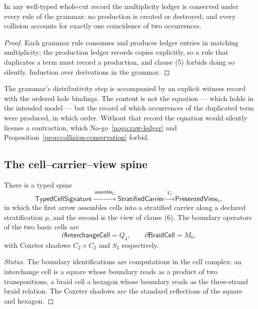 \begin{proposition}\label{prop:collision-conservation}
In any well-typed whole-cut record the multiplicity ledger is conserved under every rule of
the grammar: no production is created or destroyed, and every collision accounts for
exactly one coincidence of two occurrences.
\end{proposition}

\begin{proof}
Each grammar rule consumes and produces ledger entries in matching multiplicity; the
production ledger records copies explicitly, so a rule that duplicates a term must record a
production, and clause (5) forbids doing so silently.  Induction over derivations in the
grammar.
\end{proof}

\begin{remark}
The grammar's distributivity step is accompanied by an explicit witness record with the
ordered hole bindings.  The content is not the equation --- which holds in the intended
model --- but the record of which occurrences of the duplicated term were produced, in
which order.  Without that record the equation would silently license a contraction, which
No-go~\ref{nogo:raw-ledger} and Proposition~\ref{prop:collision-conservation} forbid.
\end{remark}

\subsection{The cell--carrier--view spine}

\begin{proposal}[Spine]\label{prop:cell-carrier-view}
There is a typed spine
\[
  \mathsf{TypedCellSignature}
  \xrightarrow{\ \mathsf{assemble}_\rho\ }
  \mathsf{StratifiedCarrier}
  \xrightarrow{\ V_\nu\ }
  \mathsf{PresentedView}_\nu ,
\]
in which the first arrow assembles cells into a stratified carrier along a declared
stratification $\rho$, and the second is the view of clause (6).  The boundary operators of
the two basic cells are
\[
  \partial\mathsf{InterchangeCell}=Q_4,\qquad
  \partial\mathsf{BraidCell}=M_6 ,
\]
with Coxeter shadows $C_2\times C_2$ and $S_3$ respectively.
\end{proposal}

\begin{proof}[Status]
The boundary identifications are computations in the cell complex: an interchange cell is a
square whose boundary reads as a product of two transpositions, a braid cell a hexagon whose
boundary reads as the three-strand braid relation.  The Coxeter shadows are the standard
reflections of the square and hexagon.
\end{proof}

